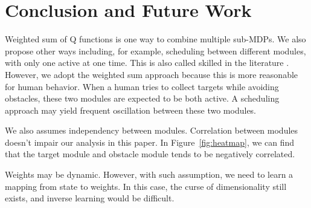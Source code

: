 \documentclass[11pt]{article} %
\begin{document}
\section{Conclusion and Future Work}
\label{sec:conclude}

Weighted sum of Q functions is one way to combine multiple sub-MDPs. We also
propose other ways including, for example, scheduling between different modules,
with only one active at one time. This is also called skilled in the literature
\cite{konidaris2009skill}. However, we adopt the weighted sum approach
because this is more reasonable for human behavior. When a human tries to collect
targets while avoiding obstacles, these two modules are expected to be both
active. A scheduling approach may yield frequent oscillation between these two
modules.

We also assumes independency between modules. Correlation between modules
doesn't impair our analysis in this paper. In Figure~\ref{fig:heatmap}, we can
find that the target module and obstacle module tends to be negatively
correlated.

Weights may be dynamic. However, with such assumption, we need to learn a
mapping from state to weights. In this case, the curse of dimensionality still
exists, and inverse learning would be difficult.



\end{document}
